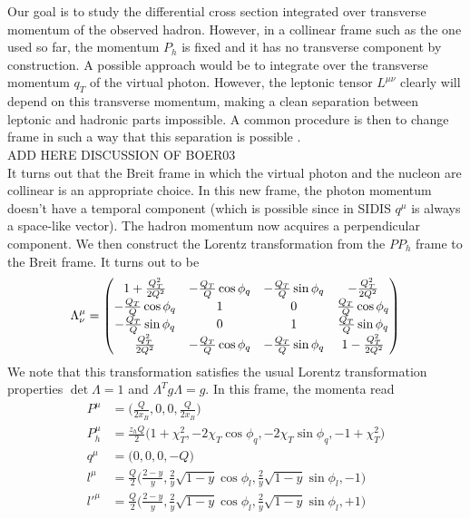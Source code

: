 Our goal is to study the differential cross section integrated over transverse momentum of the observed hadron. However, in a collinear frame such as the one used so far, the momentum $P_h$ is fixed and it has no transverse component by construction. A possible approach would be to integrate over the transverse momentum $q_T$ of the virtual photon. However, the leptonic tensor $L^{\mu\nu}$ clearly will depend on this transverse momentum, making a clean separation between leptonic and hadronic parts impossible. A common procedure is then to change frame in such a way that this separation is possible \cite{meng_semi-inclusive_1992,mulders_complete_1996, bacchetta_semi-inclusive_2007}. \\
ADD HERE DISCUSSION OF BOER03\\
It turns out that the Breit frame in which the virtual photon and the nucleon are collinear is an appropriate choice. In this new frame, the photon momentum doesn't have a temporal component (which is possible since in SIDIS $q^\mu$ is always a space-like vector). The hadron momentum  now acquires a perpendicular component. We then construct the Lorentz transformation from the $PP_h$ frame to the Breit frame. It turns out to be
\begin{equation}
    \Lambda^\mu_\nu=\mqty(1+\frac{Q_T^2}{2Q^2} & -\frac{Q_T}{Q}\cos\phi_q & -\frac{Q_T}{Q}\sin\phi_q & -\frac{Q_T^2}{2Q^2}\\
    -\frac{Q_T}{Q}\cos\phi_q  & 1 & 0 & \frac{Q_T}{Q}\cos\phi_q \\
    -\frac{Q_T}{Q}\sin\phi_q  & 0 & 1 & \frac{Q_T}{Q}\sin\phi_q \\
    \frac{Q_T^2}{2Q^2} & -\frac{Q_T}{Q}\cos\phi_q & -\frac{Q_T}{Q}\sin\phi_q & 1-\frac{Q_T^2}{2Q^2}
    )
\end{equation}
We note that this transformation satisfies the usual Lorentz transformation properties $\det\Lambda=1$ and $\Lambda^T g \Lambda=g$. In this frame, the momenta read
\begin{equation}\label{eq:momenta in BF}
    \begin{aligned}
        P^\mu&=\Big(\frac{Q}{2x_B},0,0,\frac{Q}{2x_B}\Big)\\
        P_h^\mu&=\frac{z_hQ}{2}\Big(1+\chi_T^2,-2\chi_T\cos\phi_q,-2\chi_T\sin\phi_q,-1+\chi_T^2\Big)\\
        q^\mu&=\Big(0,0,0,-Q\Big)\\
        l^\mu&=\frac{Q}{2}\Big(\frac{2-y}{y},\frac{2}{y}\sqrt{1-y}\cos\phi_l, \frac{2}{y}\sqrt{1-y}\sin\phi_l,-1\Big)\\
        l'^\mu&=\frac{Q}{2}\Big(\frac{2-y}{y},\frac{2}{y}\sqrt{1-y}\cos\phi_l, \frac{2}{y}\sqrt{1-y}\sin\phi_l,+1\Big)
    \end{aligned}
\end{equation}
